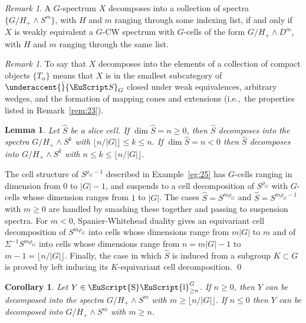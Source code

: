 \documentclass{amsart}
\newtheorem{cor}[equation]{Corollary}
\newtheorem{lem}[equation]{Lemma}
\newtheorem{rem}[equation]{Remark}
\theoremstyle{definition}
\theoremstyle{remark}
\newtheorem{rem}[equation]{Remark}
\newenvironment{pf}{\bigskip{\em Proof:\/}}{\qed\medskip}
\newcommand{\spectra}{\EuScript S}
\DeclareMathOperator{\slicesymbol}{\EuScript{S}\EuScript{l}}
\newcommand{\geslice}[1]{\slicesymbol^{G}_{\ge{#1}}}
\newcommand{\gspectra}[1]{\underaccent{\bar}{\spectra}_{#1}}
\newcommand{\slicecell}{\widehat{S}}
\newcommand{\ie}{i.e.,}
\begin{document}
\begin{rem}
\label{rem:43} A $G$-spectrum $X$ decomposes into a collection of
spectra $\{G/H_{+}\wedge S^{m} \}$, with $H$ and $m$ ranging through
some indexing list, if and only if $X$ is weakly equivalent a $G$-CW
spectrum with $G$-cells of the form $G/H_{+}\wedge D^{m}$, with $H$
and $m$ ranging through the same list.
\end{rem}

\begin{rem}
\label{rem:57}
To say that $X$ decomposes into the elements of a collection of
compact objects $\{T_{\alpha} \}$ means that $X$ is in the smallest
subcategory of $\gspectra{G}$ closed under weak equivalences,
arbitrary wedges, and the formation of mapping cones and extensions
(\ie\ the properties listed in Remark~\ref{rem:23}).
\end{rem}

\begin{lem}
\label{thm:37} Let $\slicecell$ be a slice cell.  If $\dim
\slicecell=n\ge 0$, then $\slicecell$ decomposes into the spectra
$G/H_{+}\wedge S^{k}$ with $\lfloor n/|G| \rfloor \le k\le n$.  If
$\dim \slicecell=n < 0$ then $\slicecell$ decomposes into
$G/H_{+}\wedge S^{k}$ with $n\le k \le \lfloor n/|G| \rfloor$.
\end{lem}

\begin{pf}
The cell structure of $S^{\rho_{G}-1}$ described in
Example~\ref{eg:25} has $G$-cells ranging in dimension from $0$ to
$|G|-1$, and suspends to a cell decomposition of $S^{\rho_{G}}$ with
$G$-cells whose dimension ranges from $1$ to $|G|$.  The cases
$\slicecell=S^{m\rho_{G}}$ and $\slicecell=S^{m\rho_{G}-1}$ with $m\ge
0$ are handled by smashing these together and passing to suspension
spectra.  For $m<0$, Spanier-Whitehead duality gives an equivariant
cell decomposition of $S^{m\rho_{G}}$ into cells whose dimensions
range from $m|G|$ to $m$ and of $\Sigma^{-1}S^{m\rho_{G}}$ into cells
whose dimensions range from $n=m|G|-1$ to $m-1=\lfloor
n/|G|\rfloor$. Finally, the case in which $\slicecell$ is induced from
a subgroup $K\subset G$ is proved by left inducing its $K$-equivariant
cell decomposition.
\end{pf}


\begin{cor}
\label{thm:38} Let $Y\in\geslice{n}$.  If $n\ge 0$, then $Y$ can be
decomposed into the spectra $G/H_{+}\wedge S^{m}$ with $m\ge \lfloor
n/|G|\rfloor$.  If $n\le 0$ then $Y$ can be decomposed into
$G/H_{+}\wedge S^{m}$ with $m\ge n$.
\end{cor}
\end{document}
